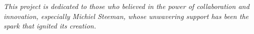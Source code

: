 \begin{center}
    \thispagestyle{empty}
    \vspace*{\fill}
    \Huge{\textit{This project is dedicated to those who believed in the power of collaboration and innovation, especially Michiel Steeman, whose unwavering support has been the spark that ignited its creation.}}
    \vspace*{\fill}
\end{center}